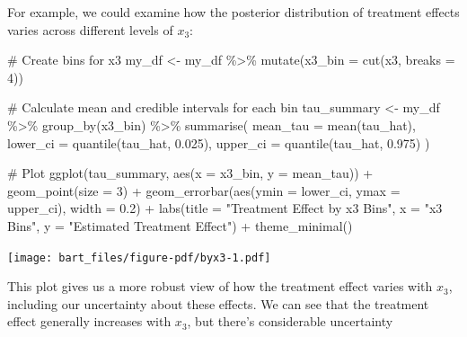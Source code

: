 \documentclass[
  letterpaper,
  DIV=11,
  numbers=noendperiod]{scrreprt}
\newenvironment{Shaded}{\begin{snugshade}}{\end{snugshade}}
\newcommand{\AttributeTok}[1]{\textcolor[rgb]{0.40,0.45,0.13}{#1}}
\newcommand{\CommentTok}[1]{\textcolor[rgb]{0.37,0.37,0.37}{#1}}
\newcommand{\DecValTok}[1]{\textcolor[rgb]{0.68,0.00,0.00}{#1}}
\newcommand{\FloatTok}[1]{\textcolor[rgb]{0.68,0.00,0.00}{#1}}
\newcommand{\FunctionTok}[1]{\textcolor[rgb]{0.28,0.35,0.67}{#1}}
\newcommand{\NormalTok}[1]{\textcolor[rgb]{0.00,0.23,0.31}{#1}}
\newcommand{\OtherTok}[1]{\textcolor[rgb]{0.00,0.23,0.31}{#1}}
\newcommand{\SpecialCharTok}[1]{\textcolor[rgb]{0.37,0.37,0.37}{#1}}
\newcommand{\StringTok}[1]{\textcolor[rgb]{0.13,0.47,0.30}{#1}}
\begin{document}
For example, we could examine how the posterior distribution of
treatment effects varies across different levels of \(x_3\):

\begin{Shaded}
\begin{Highlighting}[]
\CommentTok{\# Create bins for x3}
\NormalTok{my\_df }\OtherTok{\textless{}{-}}\NormalTok{ my\_df }\SpecialCharTok{\%\textgreater{}\%}
  \FunctionTok{mutate}\NormalTok{(}\AttributeTok{x3\_bin =} \FunctionTok{cut}\NormalTok{(x3, }\AttributeTok{breaks =} \DecValTok{4}\NormalTok{))}

\CommentTok{\# Calculate mean and credible intervals for each bin}
\NormalTok{tau\_summary }\OtherTok{\textless{}{-}}\NormalTok{ my\_df }\SpecialCharTok{\%\textgreater{}\%}
  \FunctionTok{group\_by}\NormalTok{(x3\_bin) }\SpecialCharTok{\%\textgreater{}\%}
  \FunctionTok{summarise}\NormalTok{(}
    \AttributeTok{mean\_tau =} \FunctionTok{mean}\NormalTok{(tau\_hat),}
    \AttributeTok{lower\_ci =} \FunctionTok{quantile}\NormalTok{(tau\_hat, }\FloatTok{0.025}\NormalTok{),}
    \AttributeTok{upper\_ci =} \FunctionTok{quantile}\NormalTok{(tau\_hat, }\FloatTok{0.975}\NormalTok{)}
\NormalTok{  )}

\CommentTok{\# Plot}
\FunctionTok{ggplot}\NormalTok{(tau\_summary, }\FunctionTok{aes}\NormalTok{(}\AttributeTok{x =}\NormalTok{ x3\_bin, }\AttributeTok{y =}\NormalTok{ mean\_tau)) }\SpecialCharTok{+}
  \FunctionTok{geom\_point}\NormalTok{(}\AttributeTok{size =} \DecValTok{3}\NormalTok{) }\SpecialCharTok{+}
  \FunctionTok{geom\_errorbar}\NormalTok{(}\FunctionTok{aes}\NormalTok{(}\AttributeTok{ymin =}\NormalTok{ lower\_ci, }\AttributeTok{ymax =}\NormalTok{ upper\_ci), }\AttributeTok{width =} \FloatTok{0.2}\NormalTok{) }\SpecialCharTok{+}
  \FunctionTok{labs}\NormalTok{(}\AttributeTok{title =} \StringTok{"Treatment Effect by x3 Bins"}\NormalTok{,}
       \AttributeTok{x =} \StringTok{"x3 Bins"}\NormalTok{,}
       \AttributeTok{y =} \StringTok{"Estimated Treatment Effect"}\NormalTok{) }\SpecialCharTok{+}
  \FunctionTok{theme\_minimal}\NormalTok{()}
\end{Highlighting}
\end{Shaded}

\texttt{[image: bart\_files/figure-pdf/byx3-1.pdf]}

This plot gives us a more robust view of how the treatment effect varies
with \(x_3\), including our uncertainty about these effects. We can see
that the treatment effect generally increases with \(x_3\), but there's
considerable uncertainty
\end{document}
